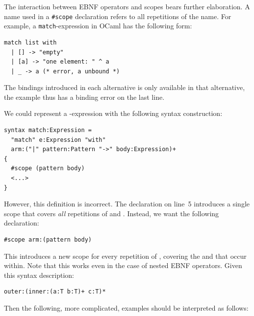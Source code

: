 \documentclass{kththesis}
\begin{document}
The interaction between EBNF operators and scopes bears further elaboration. A name used in a \texttt{#scope} declaration refers to all repetitions of the name. For example, a \texttt{match}-expression in OCaml has the following form:

\begin{verbatim}
match list with
  | [] -> "empty"
  | [a] -> "one element: " ^ a
  | _ -> a (* error, a unbound *)
\end{verbatim}

The bindings introduced in each alternative is only available in that alternative, the example thus has a binding error on the last line.

We could represent a -expression with the following syntax construction:

\begin{verbatim}
syntax match:Expression =
  "match" e:Expression "with"
  arm:("|" pattern:Pattern "->" body:Expression)+
{
  #scope (pattern body)
  <...>
}
\end{verbatim}

However, this definition is incorrect. The  declaration on line~5 introduces a single scope that covers \emph{all} repetitions of  and . Instead, we want the following declaration:

\begin{verbatim}
#scope arm:(pattern body)
\end{verbatim}

This introduces a new scope for every repetition of , covering the  and  that occur within. Note that this works even in the case of nested EBNF operators. Given this syntax description:

\begin{verbatim}
outer:(inner:(a:T b:T)+ c:T)*
\end{verbatim}

Then the following, more complicated, examples should be interpreted as follows:
\end{document}
